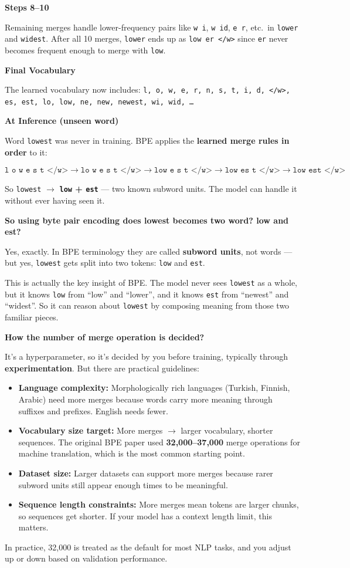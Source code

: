 \medskip
\noindent\textbf{Steps 8--10}

Remaining merges handle lower-frequency pairs like \texttt{w i}, \texttt{w id}, \texttt{e r}, etc.\ in \texttt{lower} and \texttt{widest}. After all 10 merges, \texttt{lower} ends up as \texttt{low er </w>} since \texttt{er} never becomes frequent enough to merge with \texttt{low}.

\medskip
\noindent\textbf{Final Vocabulary}

The learned vocabulary now includes: \texttt{l, o, w, e, r, n, s, t, i, d, </w>, es, est, lo, low, ne, new, newest, wi, wid, \ldots}

\medskip
\noindent\textbf{At Inference (unseen word)}

Word \texttt{lowest} was never in training. BPE applies the \textbf{learned merge rules in order} to it:

\[
\texttt{l o w e s t </w>} \to \texttt{lo w e s t </w>} \to \texttt{low e s t </w>} \to \texttt{low es t </w>} \to \texttt{low est </w>}
\]

So \texttt{lowest} $\to$ \textbf{\texttt{low} + \texttt{est}} --- two known subword units. The model can handle it without ever having seen it.

\bigskip

\textbf{So using byte pair encoding does lowest becomes two word? low and est?}

Yes, exactly. In BPE terminology they are called \textbf{subword units}, not words --- but yes, \texttt{lowest} gets split into two tokens: \texttt{low} and \texttt{est}.

This is actually the key insight of BPE. The model never sees \texttt{lowest} as a whole, but it knows \texttt{low} from ``low'' and ``lower'', and it knows \texttt{est} from ``newest'' and ``widest''. So it can reason about \texttt{lowest} by composing meaning from those two familiar pieces.

\bigskip

\textbf{How the number of merge operation is decided?}

It's a hyperparameter, so it's decided by you before training, typically through \textbf{experimentation}. But there are practical guidelines:

\begin{itemize}
\item \textbf{Language complexity:} Morphologically rich languages (Turkish, Finnish, Arabic) need more merges because words carry more meaning through suffixes and prefixes. English needs fewer.
\item \textbf{Vocabulary size target:} More merges $\to$ larger vocabulary, shorter sequences. The original BPE paper used \textbf{32,000--37,000} merge operations for machine translation, which is the most common starting point.
\item \textbf{Dataset size:} Larger datasets can support more merges because rarer subword units still appear enough times to be meaningful.
\item \textbf{Sequence length constraints:} More merges mean tokens are larger chunks, so sequences get shorter. If your model has a context length limit, this matters.
\end{itemize}

In practice, 32,000 is treated as the default for most NLP tasks, and you adjust up or down based on validation performance.